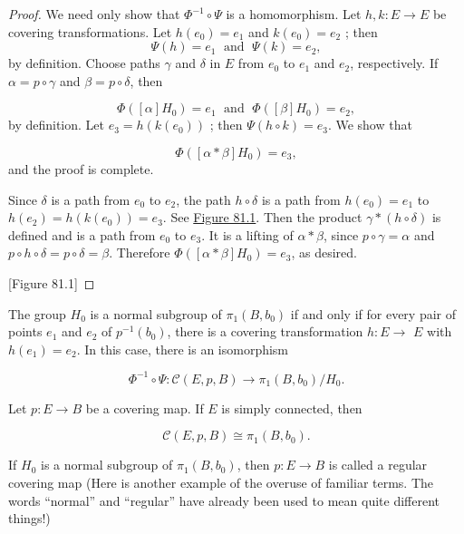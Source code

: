 \begin{proof}
	We need only show that \({\Phi }^{-1} \circ \Psi\) is a homomorphism. Let \(h,k : E \rightarrow E\) be covering transformations. Let \(h( e_{0}) = e_{1}\) and \(k( e_{0}) = e_{2}\) ; then
\[
\Psi ( h) = e_{1}\;\text{ and }\;\Psi ( k) = e_{2},
\]
by definition. Choose paths \(\gamma\) and \(\delta\) in \(E\) from \(e_{0}\) to \(e_{1}\) and \(e_{2}\), respectively. If \(\alpha = p \circ \gamma\) and \(\beta = p \circ \delta\), then

\[
\Phi ( {[ \alpha ] H_{0}}) = e_{1}\;\text{ and }\;\Phi ( {[ \beta ] H_{0}}) = e_{2},
\]
by definition. Let \(e_{3} = h( {k( e_{0}) })\) ; then \(\Psi ( {h \circ k}) = e_{3}\). We show that

\[
\Phi ( {[ {\alpha * \beta }] H_{0}}) = e_{3},
\]
and the proof is complete.

Since \(\delta\) is a path from \(e_{0}\) to \(e_{2}\), the path \(h \circ \delta\) is a path from \(h( e_{0}) = e_{1}\) to \(h( e_{2}) = h( {k( e_{0}) }) = e_{3}\). See \hyperref[fig:81.1]{Figure 81.1}. Then the product \(\gamma * ( {h \circ \delta })\) is defined and is a path from \(e_{0}\) to \(e_{3}\). It is a lifting of \(\alpha * \beta\), since \(p \circ \gamma = \alpha\) and \(p \circ h \circ \delta = p \circ \delta = \beta\). Therefore \(\Phi ( {[ {\alpha * \beta }] H_{0}}) = e_{3}\), as desired.

[Figure 81.1]
\end{proof}
\begin{corollary}
\label{cor:\thetheorem}
	The group \(H_{0}\) is a normal subgroup of \({\pi }_{1}( {B,b_{0}})\) if and only if for every pair of points \(e_{1}\) and \(e_{2}\) of \(p^{-1}( b_{0})\), there is a covering transformation \(h : E \rightarrow\) \(E\) with \(h( e_{1}) = e_{2}\). In this case, there is an isomorphism

\[
{\Phi }^{-1} \circ \Psi : \mathcal{C}( {E,p,B}) \rightarrow {\pi }_{1}( {B,b_{0}}) /H_{0}.
\]
\end{corollary}

\begin{corollary}
\label{cor:\thetheorem}
	Let \(p : E \rightarrow B\) be a covering map. If \(E\) is simply connected, then

\[
\mathcal{C}( {E,p,B}) \cong {\pi }_{1}( {B,b_{0}}).
\]

If \(H_{0}\) is a normal subgroup of \({\pi }_{1}( {B,b_{0}})\), then \(p : E \rightarrow B\) is called a regular covering map (Here is another example of the overuse of familiar terms. The words ``normal'' and ``regular'' have already been used to mean quite different things!)
\end{corollary}

